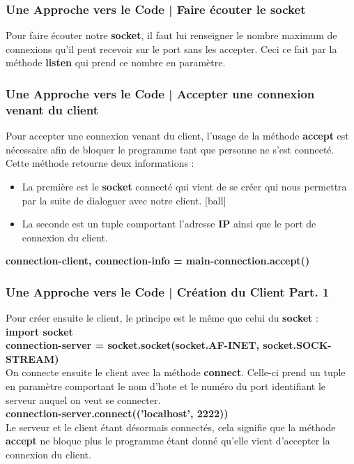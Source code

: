 \documentclass[handout]{beamer}
\begin{document}
	\begin{frame}
	\frametitle{Une Approche vers le Code | Faire écouter le socket}
	Pour faire écouter notre {\bfseries socket}, il faut lui renseigner le nombre maximum 		de connexions qu'il peut recevoir sur le port sans les accepter.
	Ceci ce fait par la méthode {\bfseries listen} qui prend ce nombre en paramètre.
	\end{frame}
	
	\begin{frame}
	\frametitle{Une Approche vers le Code | Accepter une connexion venant du client}
	Pour accepter une connexion venant du client, l'usage de la méthode {\bfseries accept} 	est nécessaire afin de bloquer le programme tant que personne ne s'est connecté.			\newline \\
	Cette méthode retourne deux informations :
	\begin{itemize}
		\item La première est le {\bfseries socket} connecté qui vient de se créer qui 				nous permettra par la suite de dialoguer avec notre client.
		\item La seconde est un tuple comportant l'adresse {\bfseries IP} ainsi que le 				port de connexion du client.\newline \\
	\end{itemize}
	{\bfseries connection-client, connection-info = main-connection.accept()}
	\end{frame}

	\begin{frame}
	\frametitle{Une Approche vers le Code | Création du Client Part. 1}
	Pour créer ensuite le client, le principe est le même que celui du {\bfseries socket} 		:\newline \\{\bfseries import socket\\
	connection-server = socket.socket(socket.AF-INET, socket.SOCK-STREAM)}						\newline \\
	On connecte ensuite le client avec la méthode {\bfseries connect}. Celle-ci prend un 		tuple en paramètre comportant le nom d'hote et le numéro du port identifiant le 			serveur auquel on veut se connecter.\newline \\
	{\bfseries connection-server.connect(('localhost', 2222))}\newline \\
	Le serveur et le client étant désormais connectés, cela signifie que la méthode 			{\bfseries accept} ne bloque plus le programme étant donné qu'elle vient d'accepter 		la connexion du client.
	\end{frame}
\end{document}

